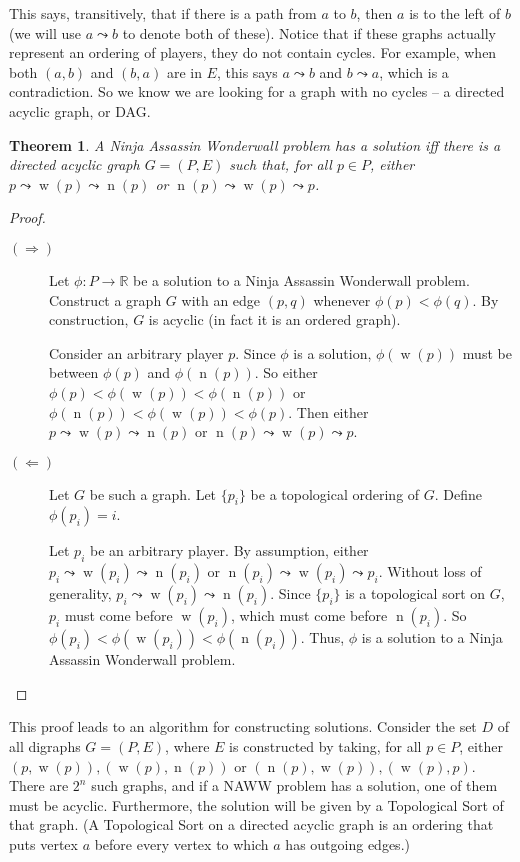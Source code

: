 \documentclass[12pt,x11names, rgb]{article}
\newtheorem*{thm}{Theorem}
\DeclareMathOperator{\w}{w}
\DeclareMathOperator{\n}{n}
\begin{document}
    This says, transitively, that if there is a path from $a$ to $b$, then $a$ is to the left of $b$ (we will use $a \leadsto b$ to denote both of these). Notice that if these graphs actually represent an ordering of players, they do not contain cycles. For example, when both $(a,b)$ and $(b,a)$ are in $E$, this says $a \leadsto b$ and $b \leadsto a$, which is a contradiction. So we know we are looking for a graph with no cycles -- a directed acyclic graph, or DAG.

    \begin{thm}
    A Ninja Assassin Wonderwall problem has a solution iff there is a directed acyclic graph $G=(P,E)$ such that, for all $p\in P$, either  $p \leadsto \w(p) \leadsto \n(p)$ or $\n(p) \leadsto \w(p) \leadsto p$.
    \end{thm}
    \begin{proof} \mbox{}

    \begin{description}
    \item[$(\Rightarrow)$] Let $\phi: P \to \mathbb{R}$ be a solution to a Ninja Assassin Wonderwall problem. Construct a graph $G$ with an edge $(p,q)$ whenever $\phi(p)<\phi(q)$. By construction, $G$ is acyclic (in fact it is an ordered graph).

    Consider an arbitrary player $p$. Since $\phi$ is a solution, $\phi(\w(p))$ must be between $\phi(p)$ and $\phi(\n(p))$. So either $\phi(p) < \phi(\w(p)) < \phi(\n(p))$ or $\phi(\n(p)) < \phi(\w(p)) < \phi(p)$. Then either $p \leadsto \w(p) \leadsto \n(p)$ or $\n(p) \leadsto \w(p) \leadsto p$.

    \item[$(\Leftarrow)$] Let $G$ be such a graph. Let $\{p_i\}$ be a topological ordering of $G$. Define $\phi(p_i) = i$. 

    Let $p_i$ be an arbitrary player. By assumption, either $p_i \leadsto \w(p_i) \leadsto \n(p_i)$ or $\n(p_i) \leadsto \w(p_i) \leadsto p_i$. Without loss of generality, $p_i \leadsto \w(p_i) \leadsto \n(p_i)$. Since $\{p_i\}$ is a topological sort on $G$, $p_i$ must come before $\w(p_i)$, which must come before $\n(p_i)$. So $\phi(p_i) < \phi(\w(p_i)) < \phi(\n(p_i))$. Thus, $\phi$ is a solution to a Ninja Assassin Wonderwall problem.
    \end{description}
    \end{proof}

    This proof leads to an algorithm for constructing solutions. Consider the set $D$ of all digraphs $G=(P,E)$, where $E$ is constructed by taking, for all $p \in P$, either  $(p,\w(p)), (\w(p),\n(p))$ or $(\n(p),\w(p)),(\w(p),p)$. There are $2^n$ such graphs, and if a NAWW problem has a solution, one of them must be acyclic. Furthermore, the solution will be given by a Topological Sort of that graph. (A Topological Sort on a directed acyclic graph is an ordering that puts vertex $a$ before every vertex to which $a$ has outgoing edges.)
\end{document}
